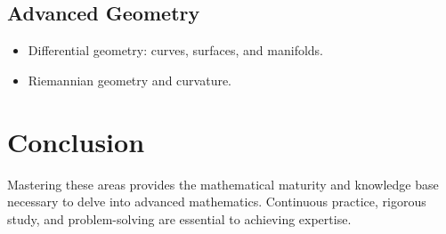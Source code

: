 \documentclass[12pt]{article}
\begin{document}
\subsection{Advanced Geometry}
\begin{itemize}
    \item Differential geometry: curves, surfaces, and manifolds.
    \item Riemannian geometry and curvature.
\end{itemize}

\section*{Conclusion}
Mastering these areas provides the mathematical maturity and knowledge base necessary to delve into advanced mathematics. Continuous practice, rigorous study, and problem-solving are essential to achieving expertise.
\end{document}
